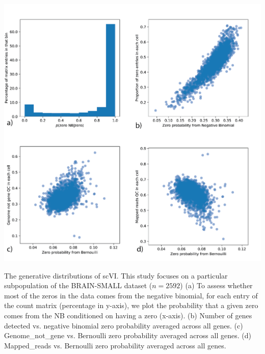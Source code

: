 \begin{suppfigure}
\centering
\includegraphics[width=\textwidth]{figures/parameter_supplement.png}
\caption[The generative distributions of scVI]{The generative distributions of scVI. This study focuses on a particular subpopulation of the BRAIN-SMALL dataset  ($n=2592$)
(a) To assess whether most of the zeros in the data comes from the negative binomial, for each entry of the count matrix (percentage in y-axis), we plot the probability that a given zero comes from the NB conditioned on having a zero (x-axis).
(b) Number of genes detected vs. negative binomial zero probability averaged across all genes.
(c) Genome\_not\_gene vs. Bernoulli zero probability averaged across all genes.
(d) Mapped\_reads vs. Bernoulli zero probability averaged across all genes. }
\label{scviparameters_supp}
\end{suppfigure}

